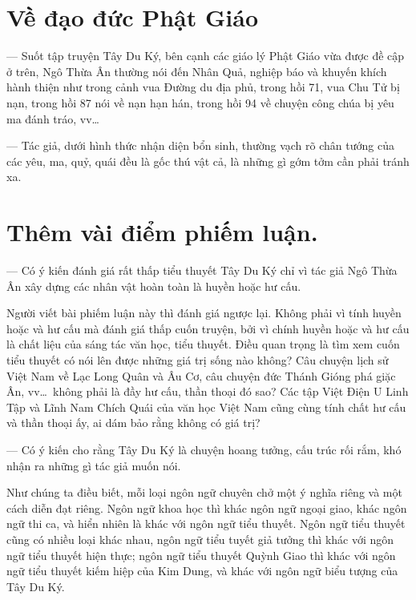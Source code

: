 \section{Về đạo đức Phật Giáo} %
\label{sec:ve_dao_duc_Phat_Giao}

— Suốt tập truyện Tây Du Ký, bên cạnh các giáo lý Phật Giáo vừa được đề cập ở trên, Ngô Thừa Ân thường nói đến Nhân Quả, nghiệp báo và khuyến khích hành thiện như trong cảnh vua Đường du địa phủ, trong hồi 71, vua Chu Tử bị nạn, trong hồi 87 nói về nạn hạn hán, trong hồi 94 về chuyện công chúa bị yêu ma đánh tráo, vv\ldots

— Tác giả, dưới hình thức nhận diện bổn sinh, thường vạch rõ chân tướng của các yêu, ma, quỷ, quái đều là gốc thú vật cả, là những gì gớm tởm cần phải tránh xa.

\section{Thêm vài điểm phiếm luận.} %
\label{sec:them_vai_diem_phiem_luan}

— Có ý kiến đánh giá rất thấp tiểu thuyết Tây Du Ký chỉ vì tác giả Ngô Thừa Ân xây dựng các nhân vật hoàn toàn là huyền hoặc hư cấu.

Người viết bài phiếm luận này thì đánh giá ngược lại. Không phải vì tính huyền hoặc và hư cấu mà đánh giá thấp cuốn truyện, bởi vì chính huyền hoặc và hư cấu là chất liệu của sáng tác văn học, tiểu thuyết. Điều quan trọng là tìm xem cuốn tiểu thuyết có nói lên được những giá trị sống nào không? Câu chuyện lịch sử Việt Nam về Lạc Long Quân và Âu Cơ, câu chuyện đức Thánh Gióng phá giặc Ân, vv\ldots ~không phải là đầy hư cấu, thần thoại đó sao? Các tập Việt Điện U Linh Tập và Lĩnh Nam Chích Quái của văn học Việt Nam cũng cùng tính chất hư cấu và thần thoại ấy, ai dám bảo rằng không có giá trị?

— Có ý kiến cho rằng Tây Du Ký là chuyện hoang tưởng, cấu trúc rối rắm, khó nhận ra những gì tác giả muốn nói.

Như chúng ta điều biết, mỗi loại ngôn ngữ chuyên chở một ý nghĩa riêng và một cách diễn đạt riêng. Ngôn ngữ khoa học thì khác ngôn ngữ ngoại giao, khác ngôn ngữ thi ca, và hiển nhiên là khác với ngôn ngữ tiểu thuyết. Ngôn ngữ tiểu thuyết cũng có nhiều loại khác nhau, ngôn ngữ tiểu tuyết giả tưởng thì khác với ngôn ngữ tiểu thuyết hiện thực; ngôn ngữ tiểu thuyết Quỳnh Giao thì khác với ngôn ngữ tiểu thuyết kiếm hiệp của Kim Dung, và khác với ngôn ngữ biểu tượng của Tây Du Ký.

